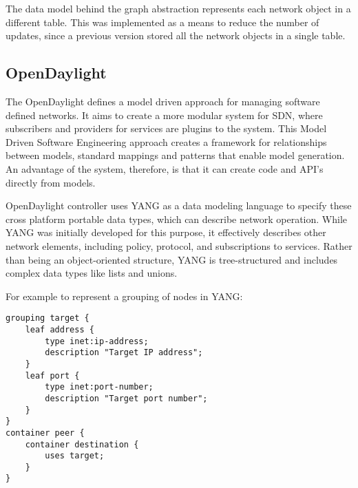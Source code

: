 \documentclass[letterpaper,twocolumn,10pt]{article}
\begin{document}
The data model behind the graph abstraction represents each network object in a different table. This was implemented as a means to reduce the number of updates, since a previous version stored all the network objects in a single table. 




% 
% 
\subsection{OpenDaylight}

The OpenDaylight defines a model driven approach for managing software defined networks. It aims to create a more modular system for SDN, where subscribers and providers for services are plugins to the system. This Model Driven Software Engineering approach creates a framework for relationships between models, standard mappings and patterns that enable model generation. An advantage of the system, therefore, is that it can create code and API's directly from models.\cite{ODL}

OpenDaylight controller uses YANG as a data modeling language to specify these cross platform portable data types, which can describe network operation. While YANG was initially developed for this purpose, it effectively describes other network elements, including policy, protocol, and subscriptions to services. Rather than being an object-oriented structure, YANG is tree-structured and includes complex data types like lists and unions.\cite{yang}

For example to represent a grouping of nodes in YANG:\cite{yang}
\begin{lstlisting}
grouping target {
    leaf address {
        type inet:ip-address;
        description "Target IP address";
    }
    leaf port {
        type inet:port-number;
        description "Target port number";
    }
}
container peer {
    container destination {
        uses target;
    }
}
\end{lstlisting}
\end{document}

